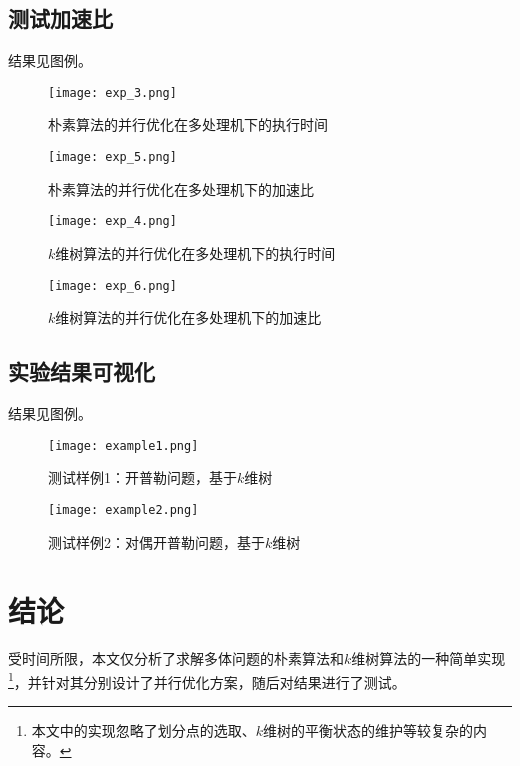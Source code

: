 \documentclass[lang=cn,11pt,a4paper,cite=authoryear]{elegantpaper}
\begin{document}
\newpage
\subsection{测试加速比}

结果见图例。

\begin{figure}[htbp]
  \centering
  \texttt{[image: exp\_3.png]}
  \caption{朴素算法的并行优化在多处理机下的执行时间}
\end{figure}

\begin{figure}[htbp]
  \centering
  \texttt{[image: exp\_5.png]}
  \caption{朴素算法的并行优化在多处理机下的加速比}
\end{figure}

\begin{figure}[htbp]
  \centering
  \texttt{[image: exp\_4.png]}
  \caption{$k$维树算法的并行优化在多处理机下的执行时间}
\end{figure}

\begin{figure}[htbp]
  \centering
  \texttt{[image: exp\_6.png]}
  \caption{$k$维树算法的并行优化在多处理机下的加速比}
\end{figure}

\newpage
\subsection{实验结果可视化}

结果见图例。

\begin{figure}[htbp]
  \centering
  \texttt{[image: example1.png]}
  \caption{测试样例1：开普勒问题，基于$k$维树}
\end{figure}

\begin{figure}[htbp]
  \centering
  \texttt{[image: example2.png]}
  \caption{测试样例2：对偶开普勒问题，基于$k$维树}
\end{figure}

\newpage
\section{结论}

受时间所限，本文仅分析了求解多体问题的朴素算法和$k$维树算法的一种简单实现
\footnote{本文中的实现忽略了划分点的选取、$k$维树的平衡状态的维护等较复杂的内容。}，并针对其分别设计了并行优化方案，随后对结果进行了测试。
\end{document}
